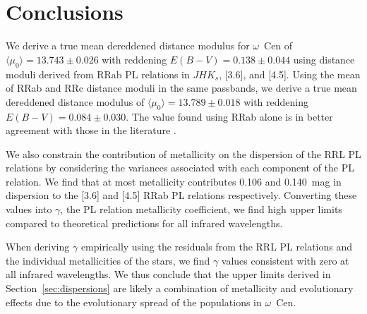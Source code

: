 \documentclass[a4paper,fleqn,usenatbib]{mnras}
\begin{document}

\section{Conclusions}
\label{sec:conclusions}

We derive a true mean dereddened distance modulus for $\omega$~Cen of ${\langle \mu_0 \rangle = 13.743 \pm 0.026}$ with reddening ${E(B-V) = 0.138 \pm 0.044}$ using distance moduli derived from RRab PL relations in $JHK_s$, [3.6], and [4.5]. Using the mean of RRab and RRc distance moduli in the same passbands, we derive a true mean dereddened distance modulus of ${\langle \mu_0 \rangle = 13.789 \pm 0.018}$ with reddening ${E(B-V) = 0.084 \pm 0.030}$. The value found using RRab alone is in better agreement with those in the literature \citep[e.g.][]{2002ASPC..265...95L, 2006ApJ...652..362D}.

We also constrain the contribution of metallicity on the dispersion of the RRL PL relations by considering the variances associated with each component of the PL relation. We find that at most metallicity contributes 0.106 and 0.140~mag in dispersion to the [3.6] and [4.5] RRab PL relations respectively. Converting these values into $\gamma$, the PL relation metallicity coefficient, we find high upper limits compared to theoretical predictions for all infrared wavelengths. 

When deriving $\gamma$ empirically using the residuals from the RRL PL relations and the individual metallicities of the stars, we find $\gamma$ values consistent with zero at all infrared wavelengths. We thus conclude that the upper limits derived in Section~\ref{sec:dispersions} are likely a combination of metallicity and evolutionary effects due to the evolutionary spread of the populations in $\omega$~Cen.  
\end{document}
